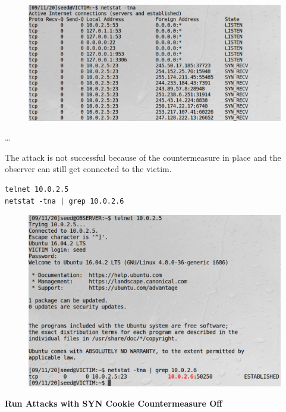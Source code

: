 \documentclass[12pt]{article}
\begin{document}
\begin{figure}[H]
    \centering
    \includegraphics[width=1\textwidth]{tcp-victim-on.png}
\end{figure}
\dots



\newpage

\noindent
The attack is not successful because of the countermeasure in place and
the observer can still get connected to the victim.

\begin{framed}
    \begin{verbatim}
telnet 10.0.2.5
netstat -tna | grep 10.0.2.6
    \end{verbatim}
\end{framed}

\begin{figure}[H]
    \centering
    \includegraphics[width=1\textwidth]{tcp-connection-on.png}
\end{figure}



\newpage

\begin{center}
    \textbf{Run Attacks with SYN Cookie Countermeasure Off}
\end{center}
\end{document}
